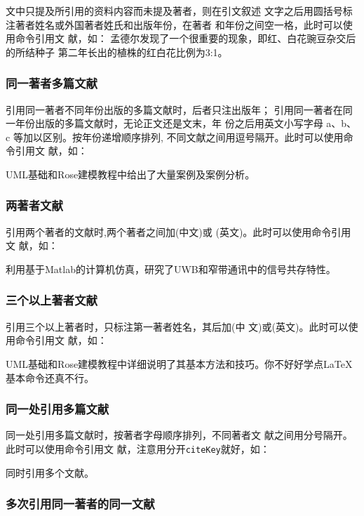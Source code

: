 文中只提及所引用的资料内容而未提及著者，则在引文叙述
文字之后用圆括号标注著者姓名或外国著者姓氏和出版年份，在著者
和年份之间空一格，此时可以使用命令引用文
献，如：
%
孟德尔发现了一个很重要的现象，即红、白花豌豆杂交后的所结种子
第二年长出的植株的红白花比例为3:1\cite{fzx1962}。%
%
\subsubsection{同一著者多篇文献}

引用同一著者不同年份出版的多篇文献时，后者只注出版年；
引用同一著者在同一年份出版的多篇文献时，无论正文还是文末，年
份之后用英文小写字母 a、b、c 等加以区别。按年份递增顺序排列,
不同文献之间用逗号隔开。此时可以使用命令引用文
献，如：

UML基础和Rose建模教程中给出了大量案例及案例分析\cite{蔡敏2006a--,蔡敏2006b--}。%

\subsubsection{两著者文献}

引用两个著者的文献时,两个著者之间加(中文)或
(英文)。此时可以使用命令引用文
献，如：

利用基于Matlab的计算机仿真\cite{郭文彬2006--}，研究了UWB和窄带通讯中的信号共存特性\cite{Chiani2009-231-254}。%

\subsubsection{三个以上著者文献}

引用三个以上著者时，只标注第一著者姓名，其后加(中
文)或(英文)。此时可以使用命令引用文
献，如：

UML基础和Rose建模教程中详细说明了其基本方法和技巧\cite{蔡敏2006--}。你不好好学点\LaTeX{}基本命令还真不行\cite{r9}。%

\subsubsection{同一处引用多篇文献}

同一处引用多篇文献时，按著者字母顺序排列，不同著者文
献之间用分号隔开。此时可以使用命令引用文
献，注意用分开\texttt{citeKey}就好，如：

同时引用多个文献\cite{r2,r3,r4,r6}。%
  
\subsubsection{多次引用同一著者的同一文献}

